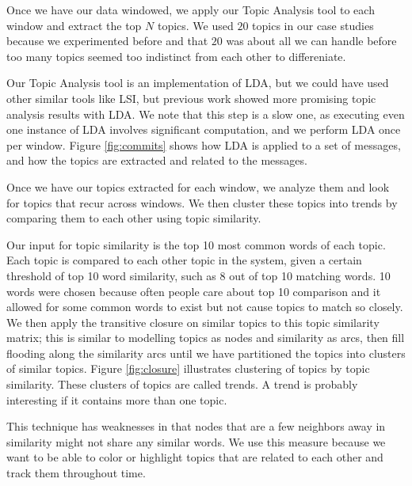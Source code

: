 \documentclass[times, 10pt,twocolumn]{article}
\newcommand{\shrinkit}{\vspace*{-.3em}}
\begin{document}
\shrinkit
{}
\shrinkit

Once we have our data windowed, we apply our Topic Analysis tool to
each window and extract the top $N$ topics. We used $20$ topics in our
case studies because we experimented before and that $20$ was about
all we can handle before too many topics seemed too indistinct from
each other to differeniate.

 Our Topic Analysis tool is an implementation of LDA, but
we could have used other similar tools like LSI, but previous work
showed more promising topic analysis results with LDA.  We note that
this step is a slow one, as executing even one instance of LDA
involves significant computation, and we perform LDA once per window.
Figure \ref{fig:commits} shows how LDA is applied to a set of
messages, and how the topics are extracted and related to the
messages.





\shrinkit
{}
\shrinkit


Once we have our topics extracted for each window, we analyze them and
look for topics that recur across windows.  We then cluster these
topics into trends by comparing them to each other using topic similarity.

Our input for topic similarity is the top 10 most common words of each
topic.  Each topic is compared to each other topic in the system,
given a certain threshold of top 10 word similarity, such as 8 out of
top 10 matching words.  10 words were chosen because often people care
about top 10 comparison and it allowed for some common words to exist
but not cause topics to match so closely.  We then apply the
transitive closure on similar topics to this topic similarity matrix;
this is similar to modelling topics as nodes and similarity as arcs,
then fill flooding along the similarity arcs until we have partitioned
the topics into clusters of similar topics. Figure \ref{fig:closure}
illustrates clustering of topics by topic similarity. These clusters
of topics are called trends. A trend is probably interesting if it
contains more than one topic.

This technique has weaknesses in that nodes that are a few neighbors
away in similarity might not share any similar words.  We use this
measure because we want to be able to color or highlight topics that
are related to each other and track them throughout time.
\end{document}

